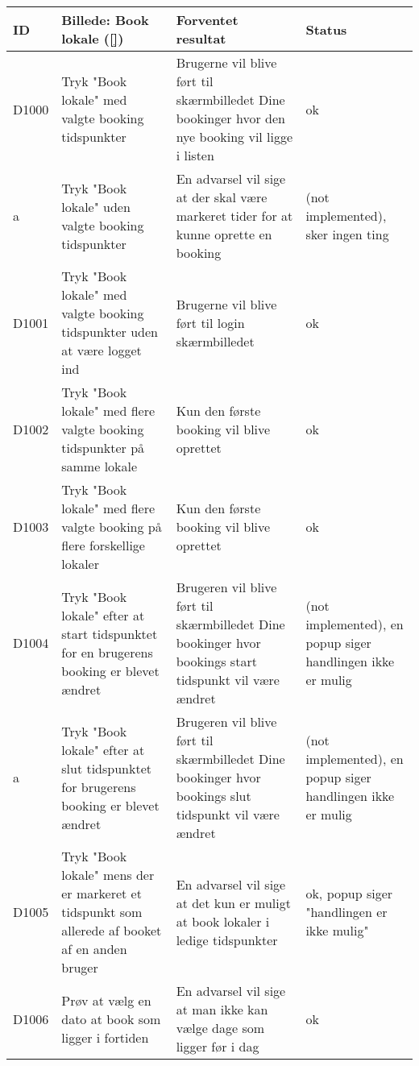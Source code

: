 \begin{tabular}{ |p{0.85cm}| p{5cm} | p{4cm} | p{1cm} | }
\hline
ID & Billede: Book lokale (\ref{})  & Forventet resultat & Status\\ 
\hline
D1000 & Tryk "Book lokale" med valgte booking tidspunkter & Brugerne vil blive ført til skærmbilledet Dine bookinger hvor den nye booking vil ligge i listen & ok\\
\hline
a & Tryk "Book lokale" uden valgte booking tidspunkter & En advarsel vil sige at der skal være markeret tider for at kunne oprette en booking &(not implemented), sker ingen ting \\
\hline
D1001 & Tryk "Book lokale" med valgte booking tidspunkter uden at være logget ind & Brugerne vil blive ført til login skærmbilledet  & ok \\
\hline
D1002 & Tryk "Book lokale" med flere valgte booking tidspunkter på samme lokale &  Kun den første booking vil blive oprettet & ok\\
\hline
D1003 & Tryk "Book lokale" med flere valgte booking på flere forskellige lokaler&  Kun den første booking vil blive oprettet & ok \\
\hline
D1004 & Tryk "Book lokale" efter at start tidspunktet for en brugerens booking er blevet ændret & Brugeren vil blive ført til skærmbilledet Dine bookinger hvor bookings start tidspunkt vil være ændret &(not implemented), en popup siger handlingen ikke er mulig \\
\hline
a & Tryk "Book lokale" efter at slut tidspunktet for brugerens booking er blevet ændret & Brugeren vil blive ført til skærmbilledet Dine bookinger hvor bookings slut tidspunkt vil være ændret &(not implemented), en popup siger handlingen ikke er mulig \\
\hline
D1005 & Tryk "Book lokale" mens der er markeret et tidspunkt som allerede af booket af en anden bruger & En advarsel vil sige at det kun er muligt at book lokaler i ledige tidspunkter & ok, popup siger "handlingen er ikke mulig" \\
\hline
D1006 & Prøv at vælg en dato at book som ligger i fortiden & En advarsel vil sige at man ikke kan vælge dage som ligger før i dag & ok \\
\end{tabular}

